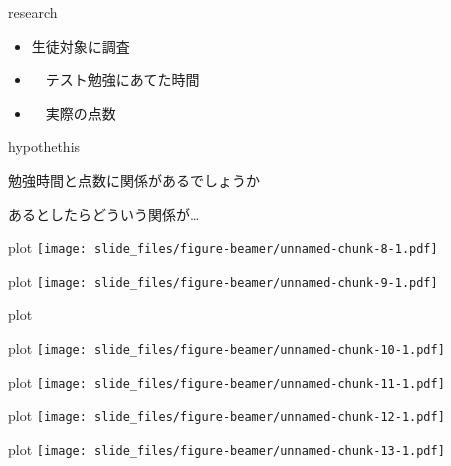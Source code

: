 \documentclass[
  ignorenonframetext,
]{beamer}
\providecommand{\tightlist}{%
  \setlength{\itemsep}{0pt}\setlength{\parskip}{0pt}}
\begin{document}
\begin{frame}{research}
\protect\hypertarget{research-1}{}
\LARGE

\begin{itemize}[<+->]
\tightlist
\item
  生徒対象に調査
\item
  　\textbullet テスト勉強にあてた時間
\item
  　\textbullet 実際の点数
\end{itemize}
\end{frame}

\begin{frame}{hypothethis}
\protect\hypertarget{hypothethis}{}
\LARGE

勉強時間と点数に関係があるでしょうか

あるとしたらどういう関係が\ldots
\end{frame}

\begin{frame}{plot}
\protect\hypertarget{plot}{}
\texttt{[image: slide\_files/figure-beamer/unnamed-chunk-8-1.pdf]}
\end{frame}

\begin{frame}{plot}
\protect\hypertarget{plot-1}{}
\texttt{[image: slide\_files/figure-beamer/unnamed-chunk-9-1.pdf]}
\end{frame}

\begin{frame}{plot}
\protect\hypertarget{plot-2}{}
\end{frame}

\begin{frame}{plot}
\protect\hypertarget{plot-3}{}
\texttt{[image: slide\_files/figure-beamer/unnamed-chunk-10-1.pdf]}
\end{frame}

\begin{frame}{plot}
\protect\hypertarget{plot-4}{}
\texttt{[image: slide\_files/figure-beamer/unnamed-chunk-11-1.pdf]}
\end{frame}

\begin{frame}{plot}
\protect\hypertarget{plot-5}{}
\texttt{[image: slide\_files/figure-beamer/unnamed-chunk-12-1.pdf]}
\end{frame}

\begin{frame}{plot}
\protect\hypertarget{plot-6}{}
\texttt{[image: slide\_files/figure-beamer/unnamed-chunk-13-1.pdf]}
\end{frame}
\end{document}
